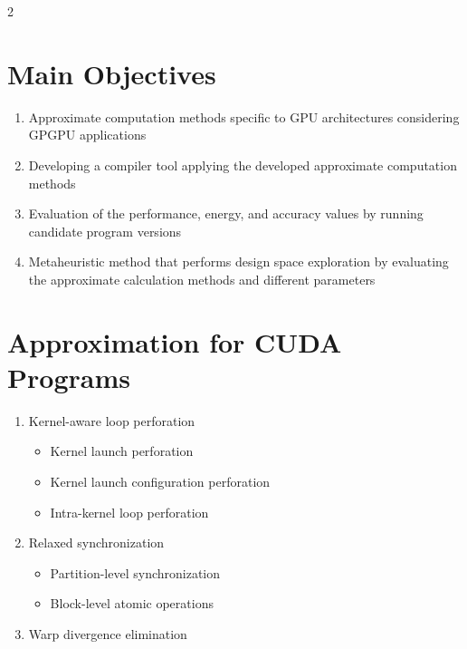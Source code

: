 \documentclass[a0,portrait]{a0poster}
\begin{document}
\begin{multicols}{2}

\color{DarkSlateGray} %

\section*{Main Objectives}
\Large
\begin{enumerate}
\item Approximate computation methods specific to GPU architectures considering GPGPU applications
\item Developing a compiler tool applying the developed approximate computation methods
\item Evaluation of the performance, energy, and accuracy values by running candidate program versions 
\item Metaheuristic method that performs design space exploration by evaluating the approximate calculation methods and different parameters 
\end{enumerate}
\normalsize

\section*{Approximation for CUDA Programs}
\Large
\begin{enumerate}
\item Kernel-aware loop perforation
\begin{itemize}
    \item Kernel launch perforation
    \item Kernel launch configuration perforation
    \item Intra-kernel loop perforation
\end{itemize}
\item Relaxed synchronization
\begin{itemize}
    \item Partition-level synchronization
    \item Block-level atomic operations
\end{itemize}
\item Warp divergence elimination
\end{enumerate}
\normalsize




\end{multicols}
\end{document}
